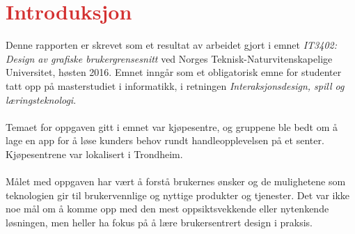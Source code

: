 \section{\textcolor[HTML]{D32F2F}{Introduksjon}}
Denne rapporten er skrevet som et resultat av arbeidet gjort i emnet \textit{IT3402: Design av grafiske brukergrensesnitt} ved Norges Teknisk-Naturvitenskapelige Universitet, høsten 2016. Emnet inngår som et obligatorisk emne for studenter tatt opp på masterstudiet i informatikk, i retningen \textit{Interaksjonsdesign, spill og læringsteknologi}.
\\\\
Temaet for oppgaven gitt i emnet var kjøpesentre, og gruppene ble bedt om å lage en app for å løse kunders behov rundt handleopplevelsen på et senter. Kjøpesentrene var lokalisert i Trondheim. 
\\\\
Målet med oppgaven har vært å forstå brukernes ønsker og de mulighetene som teknologien gir til brukervennlige og nyttige produkter og tjenester. Det var ikke noe mål om å komme opp med den mest oppsiktsvekkende eller nytenkende løsningen, men heller ha fokus på å lære brukersentrert design i praksis.